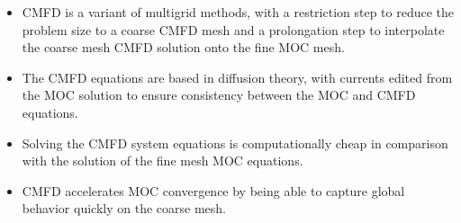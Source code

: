 \newpage
\vfill
\begin{highlightsbox}[frametitle=Highlights]
	\begin{itemize}
		\item CMFD is a variant of multigrid methods, with a restriction step to reduce the problem size to a coarse CMFD mesh and a prolongation step to interpolate the coarse mesh CMFD solution onto the fine MOC mesh.
		\item The CMFD equations are based in diffusion theory, with currents edited from the MOC solution to ensure consistency between the MOC and CMFD equations.
		\item Solving the CMFD system equations is computationally cheap in comparison with the solution of the fine mesh MOC equations.
		\item CMFD accelerates MOC convergence by being able to capture global behavior quickly on the coarse mesh.
	\end{itemize}
\end{highlightsbox}
\vfill